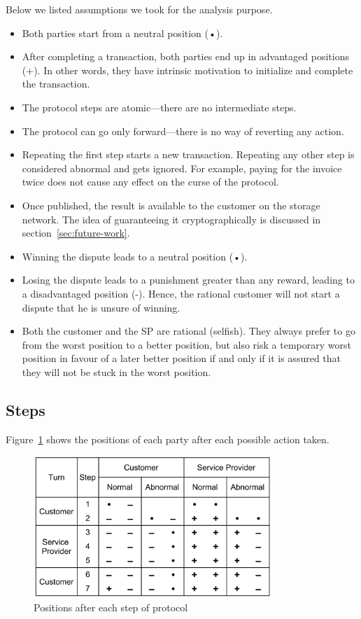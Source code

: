 \documentclass{ieeeaccess}
\begin{document}
Below  we listed assumptions we took for the analysis purpose.  

\begin{itemize}

\item
    Both parties start from a neutral position (•).
\item
    After completing a transaction, both parties end up in advantaged positions (+). In other words, they have intrinsic motivation to initialize and complete the transaction.
\item
    The protocol steps are atomic—there are no intermediate steps.
\item 
    The protocol can go only forward—there is no way of reverting any action.
\item
    Repeating the first step starts a new transaction. Repeating any other step is considered abnormal and gets ignored. For example, paying for the invoice twice does not cause any effect on the curse of the protocol.
\item 
    Once published, the result is available to the customer on the storage network. The idea of guaranteeing it cryptographically is discussed in section~\ref{sec:future-work}.
    
\item
    Winning the dispute leads to a neutral position (•).

\item
    Losing the dispute leads to a punishment greater than any reward, leading to a disadvantaged position (-). Hence, the rational customer will not start a dispute that he is unsure of winning.
\item
    Both the customer and the SP are rational (selfish). They always prefer to go from the worst position to a better position, but also risk a temporary worst position in favour of a later better position if and only if it is assured that they will not be stuck in the worst position.
\end{itemize}

\subsection{Steps}\label{steps}

Figure~\ref{fig:positions} shows the positions of each party after each possible action taken.

\begin{figure}[h!]
\includegraphics[width=9cm]{formal-table-of-positions.png}
\centering
\caption{Positions after each step of protocol}
\label{fig:positions}
\end{figure}
\end{document}
